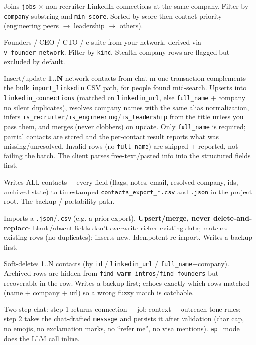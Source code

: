\documentclass[11pt,letterpaper]{article}
\newcommand{\tool}[1]{\texttt{#1}}
\newcommand{\fpath}[1]{\texttt{#1}}
\begin{document}
\begin{description}[leftmargin=0pt]
\item[\tool{find\_warm\_intros}] Joins \tool{jobs} \(\times\) non-recruiter LinkedIn connections at the same company. Filter by \texttt{company} substring and \texttt{min\_score}. Sorted by score then contact priority (engineering peers $\rightarrow$ leadership $\rightarrow$ others).
\item[\tool{find\_founders}] Founders / CEO / CTO / c-suite from your network, derived via \tool{v\_founder\_network}. Filter by \texttt{kind}. Stealth-company rows are flagged but excluded by default.
\item[\tool{add\_contacts}] Insert/update \textbf{1..N} network contacts from chat in one transaction \textemdash{} complements the bulk \tool{import\_linkedin} CSV path, for people found mid-search. Upserts into \fpath{linkedin\_connections} (matched on \texttt{linkedin\_url}, else \texttt{full\_name} + company \textemdash{} no silent duplicates), resolves company names with the same alias normalization, infers \texttt{is\_recruiter}/\texttt{is\_engineering}/\texttt{is\_leadership} from the title unless you pass them, and merges (never clobbers) on update. Only \texttt{full\_name} is required; partial contacts are stored and the per-contact result reports what was missing/unresolved. Invalid rows (no \texttt{full\_name}) are skipped + reported, not failing the batch. The client parses free-text/pasted info into the structured fields first.
\item[\tool{export\_contacts}] Writes ALL contacts + every field (flags, notes, email, resolved company, ids, archived state) to timestamped \fpath{contacts\_export\_*.csv} and \fpath{.json} in the project root. The backup / portability path.
\item[\tool{import\_contacts}] Imports a \fpath{.json}/\fpath{.csv} (e.g. a prior export). \textbf{Upsert/merge, never delete-and-replace}: blank/absent fields don't overwrite richer existing data; matches existing rows (no duplicates); inserts new. Idempotent re-import. Writes a backup first.
\item[\tool{delete\_contacts}] Soft-deletes 1..N contacts (by \texttt{id} / \texttt{linkedin\_url} / \texttt{full\_name}+company). Archived rows are hidden from \tool{find\_warm\_intros}/\tool{find\_founders} but recoverable in the row. Writes a backup first; echoes exactly which rows matched (name + company + url) so a wrong fuzzy match is catchable.
\item[\tool{draft\_outreach}] Two-step chat: step 1 returns connection + job context + outreach tone rules; step 2 takes the chat-drafted \texttt{message} and persists it after validation (char cap, no emojis, no exclamation marks, no ``refer me'', no visa mentions). \texttt{api} mode does the LLM call inline.

\end{description}
\end{document}
